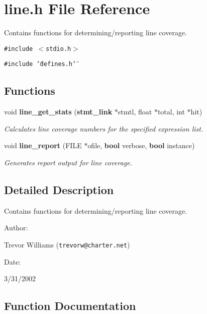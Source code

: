 \section{line.h File Reference}
\label{line_8h}
Contains functions for determining/reporting line coverage. 


{\tt \#include $<$stdio.h$>$}\par
{\tt \#include \char`\"{}defines.h\char`\"{}}\par
\subsection*{Functions}
\begin{CompactItemize}
\item 
void {\bf line\_\-get\_\-stats} ({\bf stmt\_\-link} $\ast$stmtl, float $\ast$total, int $\ast$hit)
\begin{CompactList}\small\item\em Calculates line coverage numbers for the specified expression list.\item\end{CompactList}\item 
void {\bf line\_\-report} (FILE $\ast$ofile, {\bf bool} verbose, {\bf bool} instance)
\begin{CompactList}\small\item\em Generates report output for line coverage.\item\end{CompactList}\end{CompactItemize}


\subsection{Detailed Description}
Contains functions for determining/reporting line coverage.



\begin{Desc}
\item[Author: ]\par
Trevor Williams ({\tt trevorw@charter.net}) \end{Desc}
\begin{Desc}
\item[Date: ]\par
3/31/2002\end{Desc}


\subsection{Function Documentation}

